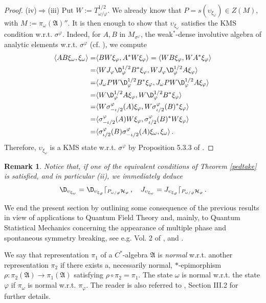 \documentclass[12pt]{amsart}
\numberwithin{equation}{section}
\def\ch{{\mathcal H}}
\def\ga{{\mathfrak A}} \def\gpa{{\mathfrak a}}
\def\r{\rho}\def\R{\mathop{\rm P}}
\def\s{\sigma} \def\S{\Sigma}
\def\f{\varphi}\def\ff{\phi} \def\F{\Phi}
\def\om{\omega} \def\Om{\Omega}
\newtheorem{rem}[thm]{Remark}
\begin{document}
\begin{proof}
(iv)$\Rightarrow$(iii) Put $W:=T^{1/2}_{\om/\f}$. We already know that $P=s(\upsilon_{\xi_\om})\in Z(M)$, with $M:=\pi_\om(\ga)''$. It is then enough to show that
$\upsilon_{\xi_\om}$ satisfies the KMS condition w.r.t. 
$\s^\f$. Indeed,
for $A,B$ in $M_{\s^\f}$, the weak${}^*$-dense involutive algebra of analytic elements w.r.t. $\s^\f$ (cf. \cite{BR, SZ, S}), we compute
\begin{align*}
\langle AB\xi_\om,\xi_\om\rangle
=&\langle BW\xi_\f,A^*W\xi_\f\rangle
=\langle WB\xi_\f,WA^*\xi_\f\rangle\\
=&\langle WJ_\f\D_\f^{1/2}B^*\xi_\f,WJ_\f\D_\f^{1/2}A\xi_\f\rangle\\
=&\langle J_\om PW\D_\f^{1/2}B^*\xi_\f,J_\om PW\D_\f^{1/2}A\xi_\f\rangle\\
=&\langle W\D_\f^{1/2}A\xi_\f,W\D_\f^{1/2}B^*\xi_\f\rangle\\
=&\langle W\s^\f_{-\iota/2}(A)\xi_\f,W\s^\f_{\iota/2}(B)^*\xi_\f\rangle\\
=&\langle\s^\f_{-\iota/2}(A)W\xi_\f,\s^\f_{\iota/2}(B)^*W\xi_\f\rangle\\
=&\langle\s^\f_{\iota/2}(B)\s^\f_{-\iota/2}(A)\xi_\om,\xi_\om\rangle\,.
\end{align*}
Therefore, $\upsilon_{\xi_\om}$ is a KMS state w.r.t. $\s^\f$ by Proposition 5.3.3 of \cite{BR}.
\end{proof}
\begin{rem}
Notice that, if one of the equivalent conditions of Theorem \ref{pedtake} is satisfied, and in particular (ii), we immediately deduce
\begin{equation*}
\D_{\upsilon_{\xi_\om}}=\D_{\upsilon_{\xi_\f}}\lceil_{P_{\om/\f}\ch_\f}\,,\quad J_{\upsilon_{\xi_\om}}=J_{\upsilon_{\xi_\f}}\lceil_{P_{\om/\f}\ch_\f}\,.
\end{equation*}
\end{rem}

We end the present section by outlining some consequence of the previous results in view of applications to Quantum Field Theory and, mainly, to Quantum Statistical Mechanics concerning the appearance of multiple phase and spontaneous symmetry breaking, see e.g. Vol. 2 of \cite{BR}, and \cite{E}. 

We say that representation $\pi_1$ of a $C^*$-algebra $\ga$ is {\it normal} w.r.t. another representation $\pi_2$ if there exists a, necessarily normal, $*$-epimorphism $\r:\pi_2(\ga)\to\pi_1(\ga)$ satisfying $\r\circ\pi_2=\pi_1$. The state $\om$ is normal w.r.t. the state $\f$ if $\pi_\om$ is normal w.r.t. $\pi_\f$. The reader is also referred to \cite{T}, Section III.2 for further details.
\end{document}
